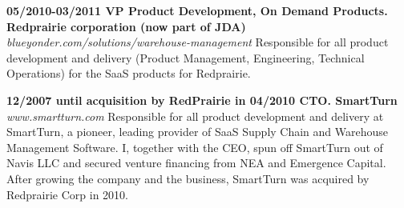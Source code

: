 \documentclass{res}
\begin{document}
\begin{resume}
{\bf 05/2010-03/2011 VP Product Development, On Demand Products. Redprairie corporation (now part of JDA)}
{\it blueyonder.com/solutions/warehouse-management}
Responsible for all product development and delivery (Product Management, Engineering, Technical Operations) for the SaaS products for Redprairie.
\begin{comment}
\begin{itemize}
    \item Led, with the General Manager of the On-Demand Division, the integration of SmartTurn into Redprairie.
    \item Developed industry leading pick and ship algorithms for high volume warehouses.
\end{itemize}
\end{comment}

{\bf 12/2007 until acquisition by RedPrairie in 04/2010 CTO. SmartTurn}
{\it www.smartturn.com}
Responsible for all product development and delivery at SmartTurn, a pioneer, leading provider of SaaS Supply Chain and Warehouse Management Software. I, together with the CEO, spun off SmartTurn out of Navis LLC and secured venture financing from NEA and Emergence Capital. After growing the company and the business, SmartTurn was acquired by Redprairie Corp in 2010.
\begin{comment}
\begin{itemize}
    \item Spun off SmartTurn out of Navis LLC with the CEO and secured VC financing from NEA and Emergence Capital.
    \item Delivered the pioneer Saas WMS system, including mobile application,  securing over 100 customers in industries from Banking to Logistics and Retail.
    \item Created and managed the technology team.
    \item Managed (with the CEO) the sale of the company to Redprairie Corp.
\end{itemize}
\end{comment}


\end{resume}
\end{document}

